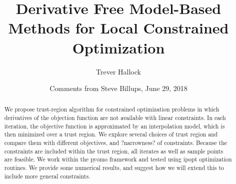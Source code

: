 \documentclass{article}
\title{Derivative Free Model-Based Methods for Local Constrained Optimization}
\author{Trever Hallock}
\date{Comments from Steve Billups, June 29, 2018}
\makeatletter
\DeclareMathOperator*{\argmin}{arg\,min}
\def\BState{\State\hskip-\ALG@thistlm}
\let\oldref\ref
\renewcommand{\ref}[1]{(\oldref{#1})}
\makeatother
\begin{document}
%
%
%
%
%
%
%
%
%




\maketitle

\begin{abstract}

We propose trust-region algorithm for constrained optimization problems in which derivatives of the objection function are not available with linear constraints. In each iteration, the objective function is approximated by an interpolation model, which is then minimized over a trust region. We explore several choices of trust region and compare them with different objectives, and ?narrowness? of constraints. Because the constraints are included within the trust region, all iterates as well as sample points are feasible. We work within the pyomo framework and tested using ipopt optimization routines. We provide some numerical results, and suggest how we will extend this to include more general constraints.

\end{abstract}

\tableofcontents

\newpage
\end{document}

